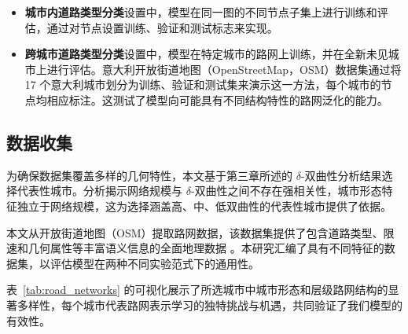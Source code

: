 \begin{itemize}
\item \textbf{城市内道路类型分类}设置中，模型在同一图的不同节点子集上进行训练和评估，通过对节点设置训练、验证和测试标志来实现。

\item \textbf{跨城市道路类型分类}设置中，模型在特定城市的路网上训练，并在全新未见城市上进行评估。意大利开放街道地图（OpenStreetMap，OSM）数据集通过将 17 个意大利城市划分为训练、验证和测试集来演示这一方法，每个城市的节点均相应标注。这测试了模型向可能具有不同结构特性的路网泛化的能力。
\end{itemize}

\subsection{数据收集}

为确保数据集覆盖多样的几何特性，本文基于第三章所述的 $\delta$-双曲性分析结果选择代表性城市。分析揭示网络规模与 $\delta$-双曲性之间不存在强相关性，城市形态特征独立于网络规模，这为选择涵盖高、中、低双曲性的代表性城市提供了依据。

本文从开放街道地图（OSM）提取路网数据，该数据集提供了包含道路类型、限速和几何属性等丰富语义信息的全面地理数据 \cite{Boeing2017}。本研究汇编了具有不同特征的数据集，以评估模型在两种不同实验范式下的通用性。

表~\ref{tab:road_networks} 的可视化展示了所选城市中城市形态和层级路网结构的显著多样性，每个城市代表路网表示学习的独特挑战与机遇，共同验证了我们模型的有效性。

